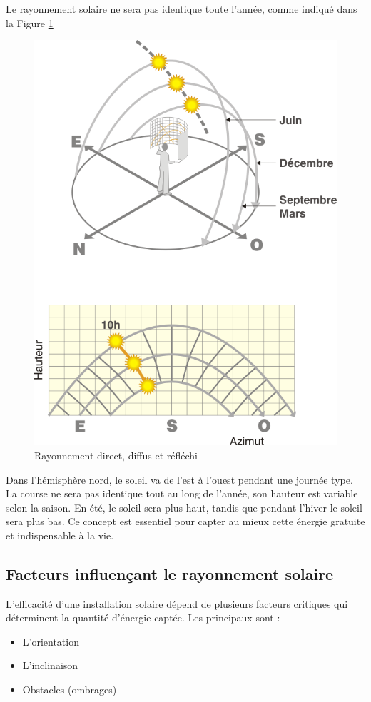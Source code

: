 \par{Le rayonnement solaire ne sera pas identique toute l'année, comme indiqué dans la Figure \ref{fig:hauteur_soleil}}

\begin{figure}[H]
    \centering
    \includegraphics[width=0.5\linewidth]{03-tail//A2_fondamentaux_energie//A2_figures/A2_hauteur_soleil.png}
    \caption{Rayonnement direct, diffus et réfléchi \cite{energie_plus_ensoleillement_2010}}
    \label{fig:hauteur_soleil}
\end{figure}

\par{Dans l'hémisphère nord, le soleil va de l'est à l'ouest pendant une journée type. La course ne sera pas identique tout au long de l'année, son hauteur est variable selon la saison. En été, le soleil sera plus haut, tandis que pendant l'hiver le soleil sera plus bas. Ce concept est essentiel pour capter au mieux cette énergie gratuite et indispensable à la vie.}

\subsection{Facteurs influençant le rayonnement solaire}
\par{L'efficacité d'une installation solaire dépend de plusieurs facteurs critiques qui déterminent la quantité d'énergie captée. Les principaux sont :}
\begin{itemize}
    \item L'orientation
    \item L'inclinaison
    \item Obstacles (ombrages)
\end{itemize}

